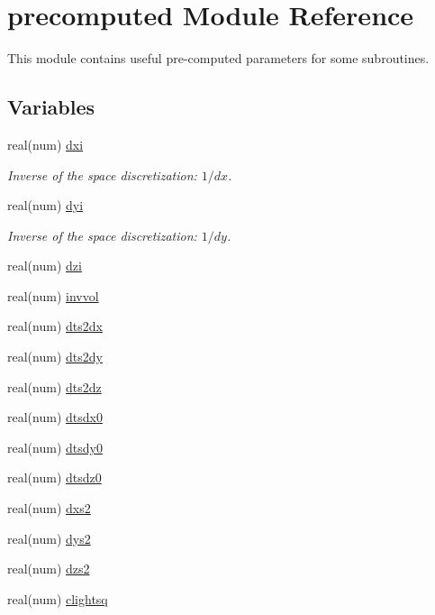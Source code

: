\hypertarget{namespaceprecomputed}{}\section{precomputed Module Reference}
\label{namespaceprecomputed}


This module contains useful pre-\/computed parameters for some subroutines.  


\subsection*{Variables}
\begin{DoxyCompactItemize}
\item 
real(num) \hyperlink{namespaceprecomputed_a3277a11e038b89b7572ad654aa6ebdf9}{dxi}
\begin{DoxyCompactList}\small\item\em Inverse of the space discretization\+: $ 1/dx $. \end{DoxyCompactList}\item 
real(num) \hyperlink{namespaceprecomputed_aba4c7d47df04f7bff362b159a9507bd0}{dyi}
\begin{DoxyCompactList}\small\item\em Inverse of the space discretization\+: $ 1/dy $. \end{DoxyCompactList}\item 
real(num) \hyperlink{namespaceprecomputed_a3c123d2eff796366a81e11166d6c27ff}{dzi}
\item 
real(num) \hyperlink{namespaceprecomputed_a6292a71558c6ec034afe504b6cf7b513}{invvol}
\item 
real(num) \hyperlink{namespaceprecomputed_a49f042055cd92a009da4a02b628430f7}{dts2dx}
\item 
real(num) \hyperlink{namespaceprecomputed_a173032b2394c4ed6da5fb1364fe17e6a}{dts2dy}
\item 
real(num) \hyperlink{namespaceprecomputed_af41461f1d38aa90f6b75318b3a6e8b70}{dts2dz}
\item 
real(num) \hyperlink{namespaceprecomputed_a2bd90255663762ded81c6d3dbdcc19d7}{dtsdx0}
\item 
real(num) \hyperlink{namespaceprecomputed_a88b7e24cb65cc21e1b7615d05e084b76}{dtsdy0}
\item 
real(num) \hyperlink{namespaceprecomputed_a343fe0f72331fa141bb2d08cb34a43af}{dtsdz0}
\item 
real(num) \hyperlink{namespaceprecomputed_a4119d52a225aef26edac32983c0b904e}{dxs2}
\item 
real(num) \hyperlink{namespaceprecomputed_a82348c2bcd0de288186bf33726d7d35a}{dys2}
\item 
real(num) \hyperlink{namespaceprecomputed_a346904589bbf53c6f100296d1b29b7ca}{dzs2}
\item 
real(num) \hyperlink{namespaceprecomputed_adbd674e54a2326703d464d475f0d1dc2}{clightsq}
\end{DoxyCompactItemize}



